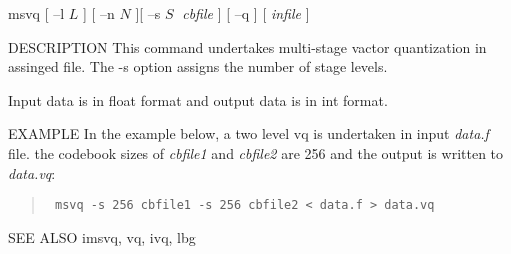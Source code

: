 
\begin{synopsis}
\item [msvq] [ --l $L$ ] [ --n $N$ ][ --s $S \;$ {\em cbfile} ] [ --q ] [ {\em infile} ]
\end{synopsis}

\begin{qsection}{DESCRIPTION}
This command undertakes multi-stage vactor quantization in
assinged file. 
The -s option assigns the number of stage levels.
\par
Input data is in float format and output data is in int format.
\end{qsection}

\begin{options}
\end{options}

\begin{qsection}{EXAMPLE}
In the example below, a two level vq is undertaken in input {\em data.f}
file. the codebook sizes of 
{\em cbfile1} and {\em cbfile2} are 256 and the output is written
to {\em data.vq}:
\begin{quote}
\verb! msvq -s 256 cbfile1 -s 256 cbfile2 < data.f > data.vq!
\end{quote} 
\end{qsection}

\begin{qsection}{SEE ALSO}
 imsvq, vq, ivq, lbg
\end{qsection}

